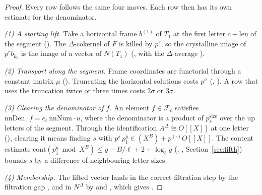 \documentclass[11pt]{article}
\newcommand{\NN}{N^{\Delta}}
\theoremstyle{definition}
\theoremstyle{remark}
\begin{document}
\begin{proof}
Every row follows the same four moves. Each row then has its own estimate for the denominator.

\emph{(1) A starting lift.} Take a horizontal frame $b^{(1)}$ of $T_1$ at the first letter $c-\mathrm{len}$ of the segment (). The $\Delta$-cokernel of $F$ is killed by $p^r$, so the crystalline image of $p^rb_{k_0}$ is the image of a vector of $N(T_1)$ (, with the $\Delta$-average ).

\emph{(2) Transport along the segment.} Frame coordinates are functorial through a constant matrix $\mu$ (). Truncating the horizontal solutions costs $p^\sigma$ (, ). A row that uses the truncation twice or three times costs $2\sigma$ or $3\sigma$.

\emph{(3) Clearing the denominator of $f$.} An element $f\in\mathcal F_c$ satisfies $\mathrm{nnDen}\cdot f=e_c\,\mathrm{nnNum}\cdot u$, where the denominator is a product of $p_s^{\mathrm{size}}$ over the up letters of the segment. Through the identification $A^\Delta\cong O[[X]]$ at one letter (), clearing it means finding $s$ with $p^s\,p_1^y\in(X^B)+p^{(\cdot)}O[[X]]$. The content estimate $\mathrm{cont}(p_1^y\bmod X^B)\le y-B/\ell+2+\log_\ell y$ (, , Section~\ref{sec:fifth}) bounds $s$ by a difference of neighbouring letter sizes.

\emph{(4) Membership.} The lifted vector lands in the correct filtration step by the filtration gap , and in $\NN$ by  and , which gives .


\end{proof}
\end{document}
